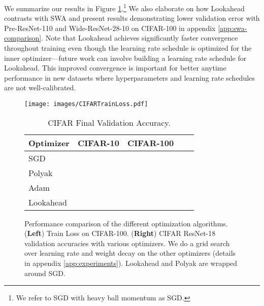 \documentclass{article}
\begin{document}
We summarize our results in Figure \ref{tabel:cifar-optimizer-compare}.\footnote{We refer to SGD with heavy ball momentum \citep{polyak1964some} as SGD.} We also elaborate on how Lookahead contrasts with SWA and present results demonstrating lower validation error with Pre-ResNet-110 and Wide-ResNet-28-10 \cite{Zagoruyko2016WRN} on CIFAR-100 in appendix \ref{app:swa-comparison}.  Note that Lookahead achieves significantly faster convergence throughout training even though the learning rate schedule is optimized for the inner optimizer---future work can involve building a learning rate schedule for Lookahead. This improved convergence is important for better anytime performance in new datasets where hyperparameters and learning rate schedules are not well-calibrated.


\begin{figure}[t]
\centering
\begin{minipage}[t]{0.48 \linewidth}
    \centering
    \texttt{[image: images/CIFARTrainLoss.pdf]}
\end{minipage}
\hfill
\begin{minipage}[t]{0.48 \linewidth}
\begin{table}[H]
\begin{center}
\vspace{-1.4in}
\begin{sc}
\begin{tabular}{l c c c c }
\toprule
Optimizer & CIFAR-10 & CIFAR-100  \\
\midrule
SGD &  &  \\ 
Polyak &  &  \\
Adam &  &  \\ 
Lookahead &  &  \\
\bottomrule
\end{tabular}
\end{sc}
\end{center}
\caption{CIFAR Final Validation Accuracy.}
\end{table}
\end{minipage}
\caption{Performance comparison of the different optimization algorithms. ({\bf{Left}}) Train Loss on CIFAR-100. ({\bf{Right}}) CIFAR ResNet-18 validation accuracies with various optimizers. We do a grid search over learning rate and weight decay on the other optimizers (details in appendix \ref{app:experiments}). Lookahead and Polyak are wrapped around SGD.}
\label{tabel:cifar-optimizer-compare}
\end{figure}
\end{document}
